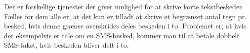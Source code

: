 Der er forskellige tjenester der giver mulighed for at skrive korte tekstbeskeder. Fælles for dem alle er, at det kun er tilladt at skrive et begrænset antal tegn pr. besked, hvis denne grænse overskrides deles beskeden i to. Problemet er, at hvis der eksempelvis er tale om en SMS-besked, kommer man til at betale dobbelt SMS-takst, hvis beskeden bliver delt i to.
